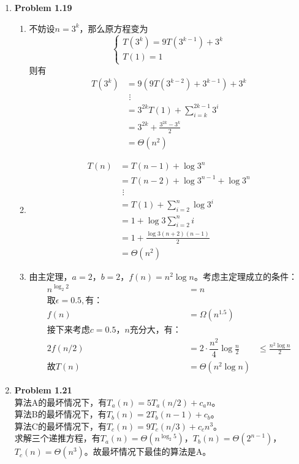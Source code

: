\documentclass[utf8]{ctexart}
\begin{document}
\begin{enumerate}[label=\arabic*.]
    \item \textbf{Problem 1.19}\begin{enumerate}[label= (\arabic*)]
        \item [(2)] 不妨设$n=3^k$，那么原方程变为\[\begin{cases}
            T(3^k)=9T(3^{k-1})+3^k\\
            T(1)=1
        \end{cases}\]
        则有\[\begin{aligned}
            T(3^k)&=9(9T(3^{k-2})+3^{k-1})+3^k\\
            &\,\,\vdots\\
            &=3^{2k}T(1)+\sum_{i=k}^{2k-1}3^i\\
            &=3^{2k}+\frac{3^{2k}-3^{k}}{2}\\
            &=\Theta(n^2)
        \end{aligned}\]
        \item [(4)] \[\begin{aligned}
            T(n)&=T(n-1)+\log{3^n}\\
            &=T(n-2)+\log{3^{n-1}}+\log{3^n}\\
            &\,\,\vdots\\
            &=T(1)+\sum_{i=2}^{n}\log{3^i}\\
            &=1+\log3\sum_{i=2}^{n}i\\
            &=1+\frac{\log3(n+2)(n-1)}{2}\\
            &=\Theta(n^2)
        \end{aligned}\]
        \item [(6)]由主定理，$a=2$，$b=2$，$f(n)=n^2\log{n}$。考虑主定理成立的条件：
        \[\begin{aligned}
            n^{\log_2{2}}&=n\\
            \text{取}\epsilon=0.5,\text{有：}\\
            f(n)&=\Omega(n^{1.5})\\
            \text{接下来考虑}c=0.5\text{，}n\text{充分大，有：}\\
            2f(n/2)&=2\cdot \dfrac{n^2}{4}\log{\frac{n}{2}}&\le\frac{n^2\log{n}}{2}\\
            \text{故}T(n)&=\Theta(n^2\log{n})
        \end{aligned}\]
    \end{enumerate}
    \item \textbf{Problem 1.21}\\
        算法A的最坏情况下，有$T_a(n)=5T_a(n/2)+c_an$。\\
        算法B的最坏情况下，有$T_b(n)=2T_b(n-1)+c_b$。\\
        算法C的最坏情况下，有$T_c(n)=9T_c(n/3)+c_cn^3$。\\
        求解三个递推方程，有$T_a(n)=\Theta(n^{\log_2{5}})$，$T_b(n)=\Theta(2^{n-1})$，$T_c(n)=\Theta(n^3)$。故最坏情况下最佳的算法是A。
\end{enumerate}
\end{document}
